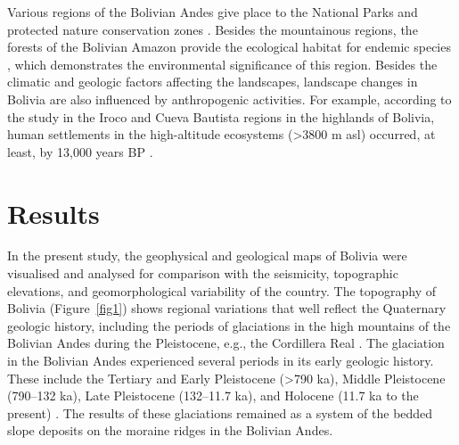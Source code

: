\documentclass[data,article,accept,pdftex,moreauthors]{Definitions/mdpi}
\begin{document}
Various regions of the Bolivian Andes give place to the National Parks and protected nature conservation zones \cite{Baumannetal2018,Thomasetal,Burbridge}. Besides {the} mountainous regions, the forests of the Bolivian Amazon provide {the} ecological habitat for {}endemic species \cite{Cadima}, which demonstrates the environmental significance of this region. Besides {the climatic and geologic} factors affecting the landscapes, {landscape} changes in Bolivia {are also influenced by } anthropogenic activities. {For example,} according to the study in the Iroco and Cueva Bautista regions in the highlands of Bolivia, human settlements in the high-altitude ecosystems (>3800 m asl) occurred, at least, by 13,000 years BP \cite{Capriles}. 



\section{Results}

In {the} present study{,} the geophysical{ }and geological {maps} of Bolivia were {visualised and }analysed for{ }comparison with{ the }seismicity{, }topographic elevations,{ and }geomorphological variability{ }of the country. The topography of Bolivia (Figure~\ref{fig1}) shows regional variations that well reflect {the} Quaternary geologic history{, including} the periods of glaciations {in the high} mountains {of} the Bolivian Andes {during the} Pleistocene, e.g.{, the} Cordillera Real \cite{Heine}. {The} glaciation in {the} Bolivian Andes experienced several {periods} in its early geologic history. {These} include {the} Tertiary and Early Pleistocene{ }(>790 ka), Middle Pleistocene{ }(790–132 ka){, }Late Pleistocene{ }(132–11.7 ka),{ and }Holocene{ }(11.7 ka to the present) \cite{Frenierre}. The results of {these} glaciations remained as {a system of the} bedded slope deposits on {the} moraine ridges in the Bolivian Andes. 
\end{document}
